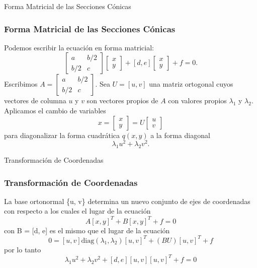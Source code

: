 \documentclass[xcolor={dvipsnames},aspectratio=169,10pt]{beamer}
\begin{document}
\begin{frame}{Forma Matricial de las Secciones Cónicas}
  \frametitle{Forma Matricial de las Secciones Cónicas}
  Podemos escribir la ecuación en forma matricial:
  \begin{equation*}
    [x, y] \begin{bmatrix} a & b/2 \\ b/2 & c \end{bmatrix} \begin{bmatrix} x \\ y \end{bmatrix} + [d, e] \begin{bmatrix} x \\ y \end{bmatrix} + f = 0.
  \end{equation*}
  Escribimos $A = \begin{bmatrix} a & b/2 \\ b/2 & c \end{bmatrix}$. Sea $U = [u, v]$ una matriz ortogonal cuyos vectores de columna $u$ y $v$ son vectores propios de $A$ con valores propios $\lambda_1$ y $\lambda_2$. Aplicamos el cambio de variables
  \begin{equation*}
    x = \begin{bmatrix} x \\ y \end{bmatrix} = U \begin{bmatrix} u \\ v \end{bmatrix}
  \end{equation*}
  para diagonalizar la forma cuadrática $q(x, y)$ a la forma diagonal
  \begin{equation*}
    \lambda_1u^2 + \lambda_2v^2.
  \end{equation*}
\end{frame}

\begin{frame}{Transformación de Coordenadas}
  \frametitle{Transformación de Coordenadas}
  La base ortonormal \{u, v\} determina un nuevo conjunto de ejes de coordenadas con respecto a los cuales el lugar de la ecuación
  \begin{equation*}
    [x, y] A [x, y]^T + B [x, y]^T + f = 0
  \end{equation*}
  con B = [d, e] es el mismo que el lugar de la ecuación
  \begin{equation*}
    0 = [u, v] \text{diag} (\lambda_1, \lambda_2) [u, v]^T + (BU) [u, v]^T + f
  \end{equation*}
  por lo tanto
  \begin{equation*}
    \lambda_1 u^2 + \lambda_2 v^2 + [d, e] [u, v] [u, v]^T + f = 0 \tag{2}
  \end{equation*}
\end{frame}
\end{document}
